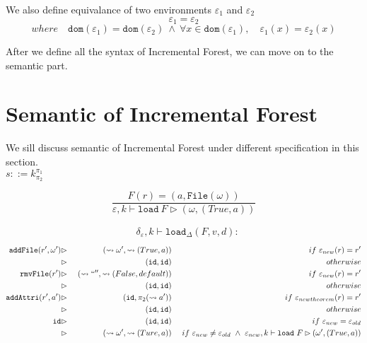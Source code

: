 \documentclass[10pt,twoside,a4paper]{article}
\theoremstyle{theorem}
\theoremstyle{lemma}
\theoremstyle{property}
\theoremstyle{definition}
\theoremstyle{assumption}
\def\snd{\pi_2}
\def\id{\mathtt{id}}
\begin{document}
We also define equivalance of two environments $\varepsilon_1$ and $\varepsilon_2$
\begin{displaymath}
	\varepsilon_1 = \varepsilon_2
\end{displaymath}
\begin{displaymath}
	where \quad \mathtt{dom}(\varepsilon_1) = \mathtt{dom}(\varepsilon_2) ~\wedge~ \forall x \in \mathtt{dom}(\varepsilon_1), \quad \varepsilon_1(x) = \varepsilon_2(x)
\end{displaymath}

After we define all the syntax of Incremental Forest, we can move on to the semantic part.

\section{Semantic of Incremental Forest}

We sill discuss semantic of Incremental Forest under different specification in this section.\\

$\boxed{s ::= k^{\pi_1}_{\pi_2}}$

\begin{displaymath}
	\frac{F(r) = (a, \mathtt{File}(\omega))}
	{\varepsilon, k \vdash \mathtt{load}~F \rhd (\omega, (True, a))}
\end{displaymath}

\begin{align*}
	&\delta_\varepsilon, k \vdash \mathtt{load}_\Delta (F,v,d):
\end{align*}
\begin{align*}
	\mathtt{addFile}(r',\omega') &\rhd& ~(\leadsto \omega', \leadsto(True, a))			& &~if ~\varepsilon_{new}(r) = r' \\
								 &\rhd& ~(\id,\id)								& &~otherwise \\
	\mathtt{rmvFile}(r') 		 &\rhd& ~(\leadsto `` '', \leadsto(False, default))			& &~if ~\varepsilon_{new}(r) = r' \\
								 &\rhd& ~(\id,\id)								& &~otherwise \\
	\mathtt{addAttri}(r', a')	 &\rhd& ~(\id, \snd(\leadsto a'))				& &~if ~\varepsilon_{newtheorem}(r) = r' \\
								 &\rhd& ~(\id,\id)								& &~otherwise	\\
	\mathtt{id}					 &\rhd& ~(\id,\id)								& &~ if ~\varepsilon_{new} = \varepsilon_{old}\\
								 &\rhd& ~(\leadsto \omega', \leadsto (Ture, a))				& &~ if ~\varepsilon_{new} \not= \varepsilon_{old} ~\wedge ~\varepsilon_{new}, k \vdash \mathtt{load}~F \rhd (\omega', (True, a))
\end{align*}
\end{document}
